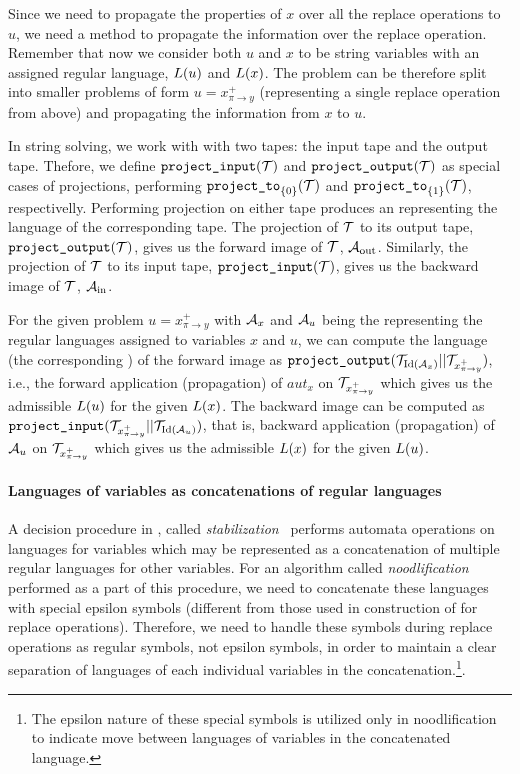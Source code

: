 Since we need to propagate the properties of $x$ over all the replace operations to $u$, we need a method to propagate the information over the replace operation.
Remember that now we consider both $u$ and $x$ to be string variables with an assigned regular language, $L(u)$ and $L(x)$.
The problem can be therefore split into smaller problems of form $ u = x^{+}_{\pi \rightarrow y}$ (representing a single replace operation from above) and propagating the information from $x$ to $u$.

In string solving, we work with \nfts with two tapes: the input tape and the output tape.
Thefore, we define $\texttt{project\_input}(\mathcal{T})$ and $\texttt{project\_output}(\mathcal{T})$ as special cases of projections, performing $\texttt{project\_to}_{\{ 0 \}}(\mathcal{T})$ and $\texttt{project\_to}_{\{ 1 \}}(\mathcal{T})$, respectivelly.
Performing projection on either tape produces an \nfa representing the language of the corresponding tape.
The projection of \nft $\mathcal{T}$ to its output tape, $\texttt{project\_output}(\mathcal{T})$, gives us the forward image of $\mathcal{T}$, \nfa $\mathcal{A}_{\text{out}}$.
Similarly, the projection of \nft $\mathcal{T}$ to its input tape, $\texttt{project\_input}(\mathcal{T})$, gives us the backward image of $\mathcal{T}$, \nfa $\mathcal{A}_{\text{in}}$.

For the given problem $ u = x^{+}_{\pi \rightarrow y}$ with $\mathcal{A}_x$ and $\mathcal{A}_u$ being the \nfas representing the regular languages assigned to variables $x$ and $u$, we can compute the language (the corresponding \nfa) of the forward image as $\texttt{project\_output}(\mathcal{T}_{\text{Id}(\mathcal{A}_x)} || \mathcal{T}_{x^+_{\pi \rightarrow y}})$, i.e., the forward application (propagation) of $aut_x$ on $\mathcal{T}_{x^+_{\pi \rightarrow y}}$ which gives us the admissible $L(u)$ for the given $L(x)$.
The backward image can be computed as $\texttt{project\_input}(\mathcal{T}_{x^+_{\pi \rightarrow y}} || \mathcal{T}_{\text{Id}(\mathcal{A}_u)})$, that is, backward application (propagation) of $\mathcal{A}_u$ on $\mathcal{T}_{x^+_{\pi \rightarrow y}}$ which gives us the admissible $L(x)$ for the given $L(u)$.

\paragraph{Languages of variables as concatenations of regular languages}
A decision procedure in \noodler, called \emph{stabilization}~\cite{oopsla23_stabilization_DBLP:journals/pacmpl/ChenCHHLS23}
performs automata operations on languages for variables which may be represented as a concatenation of multiple regular languages for other variables.
For an algorithm called \emph{noodlification} performed as a part of this procedure, we need to concatenate these languages with special epsilon symbols (different from those used in construction of \nfts for replace operations).
Therefore, we need to handle these symbols during replace operations as regular symbols, not epsilon symbols, in order to maintain a clear separation of languages of each individual variables in the concatenation.\footnote{The epsilon nature of these special symbols is utilized only in noodlification to indicate move between languages of variables in the concatenated language.}.

